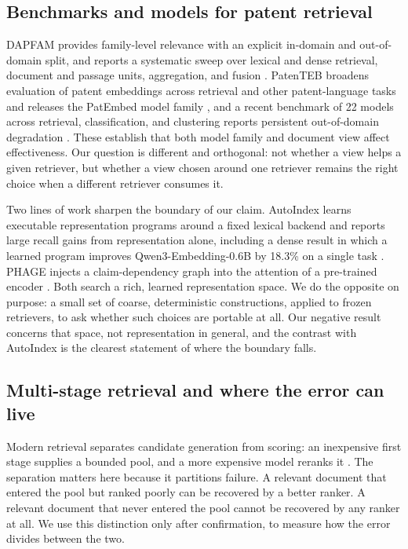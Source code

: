 \documentclass[preprint,11pt,authoryear]{elsarticle}
\begin{document}
\subsection{Benchmarks and models for patent retrieval}

DAPFAM provides family-level relevance with an explicit in-domain and out-of-domain split, and reports a systematic sweep over lexical and dense retrieval, document and passage units, aggregation, and fusion \citep{ayaou2026dapfam}. PatenTEB broadens evaluation of patent embeddings across retrieval and other patent-language tasks and releases the PatEmbed model family \citep{ayaou2025patenteb}, and a recent benchmark of 22 models across retrieval, classification, and clustering reports persistent out-of-domain degradation \citep{yousefiramandi2026patent}. These establish that both model family and document view affect effectiveness. Our question is different and orthogonal: not whether a view helps a given retriever, but whether a view chosen around one retriever remains the right choice when a different retriever consumes it.

Two lines of work sharpen the boundary of our claim. AutoIndex learns executable representation programs around a fixed lexical backend and reports large recall gains from representation alone, including a dense result in which a learned program improves Qwen3-Embedding-0.6B by 18.3\% on a single task \citep{onuallain2026autoindex}. PHAGE injects a claim-dependency graph into the attention of a pre-trained encoder \citep{phage2026}. Both search a rich, learned representation space. We do the opposite on purpose: a small set of coarse, deterministic constructions, applied to frozen retrievers, to ask whether such choices are portable at all. Our negative result concerns that space, not representation in general, and the contrast with AutoIndex is the clearest statement of where the boundary falls.

\subsection{Multi-stage retrieval and where the error can live}

Modern retrieval separates candidate generation from scoring: an inexpensive first stage supplies a bounded pool, and a more expensive model reranks it \citep{asadi2013candidate,nogueira2019passage}. The separation matters here because it partitions failure. A relevant document that entered the pool but ranked poorly can be recovered by a better ranker. A relevant document that never entered the pool cannot be recovered by any ranker at all. We use this distinction only after confirmation, to measure how the error divides between the two.
\end{document}

